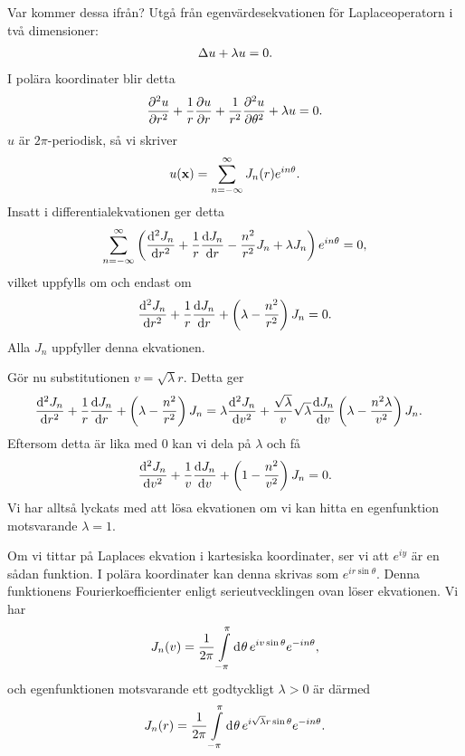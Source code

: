 Var kommer dessa ifrån? Utgå från egenvärdesekvationen för Laplaceoperatorn i två dimensioner:
\begin{align*}
	\Delta u + \lambda u = 0.
\end{align*}
I polära koordinater blir detta
\begin{align*}
	\pdv[2]{u}{r} + \frac{1}{r}\pdv{u}{r} + \frac{1}{r^{2}}\pdv[2]{u}{\theta} + \lambda u = 0.
\end{align*}
$u$ är $2\pi$-periodisk, så vi skriver
\begin{align*}
	u(\vb{x}) = \sum\limits_{n = -\infty}^{\infty}J_{n}(r)e^{in\theta}.
\end{align*}
Insatt i differentialekvationen ger detta
\begin{align*}
	\sum\limits_{n = -\infty}^{\infty}\left(\dv[2]{J_{n}}{r} + \frac{1}{r}\dv{J_{n}}{r} - \frac{n^{2}}{r^{2}}J_{n} + \lambda J_{n}\right)e^{in\theta} = 0,
\end{align*}
vilket uppfylls om och endast om
\begin{align*}
	\dv[2]{J_{n}}{r} + \frac{1}{r}\dv{J_{n}}{r} + \left(\lambda - \frac{n^{2}}{r^{2}}\right)J_{n} = 0.
\end{align*}
Alla $J_{n}$ uppfyller denna ekvationen.

Gör nu substitutionen $v = \sqrt{\lambda}r$. Detta ger
\begin{align*}
	\dv[2]{J_{n}}{r} + \frac{1}{r}\dv{J_{n}}{r} + \left(\lambda - \frac{n^{2}}{r^{2}}\right)J_{n} &= \lambda\dv[2]{J_{n}}{v} + \frac{\sqrt{\lambda}}{v}\sqrt{\lambda}\dv{J_{n}}{v} \left(\lambda - \frac{n^{2}\lambda}{v^{2}}\right)J_{n}.
\end{align*}
Eftersom detta är lika med $0$ kan vi dela på $\lambda$ och få
\begin{align*}
	\dv[2]{J_{n}}{v} + \frac{1}{v}\dv{J_{n}}{v} + \left(1 - \frac{n^{2}}{v^{2}}\right)J_{n} = 0.
\end{align*}
Vi har alltså lyckats med att lösa ekvationen om vi kan hitta en egenfunktion motsvarande $\lambda = 1$.

Om vi tittar på Laplaces ekvation i kartesiska koordinater, ser vi att $e^{iy}$ är en sådan funktion. I polära koordinater kan denna skrivas som $e^{ir\sin{\theta}}$. Denna funktionens Fourierkoefficienter enligt serieutvecklingen ovan löser ekvationen. Vi har
\begin{align*}
	J_{n}(v) = \frac{1}{2\pi}\int\limits_{-\pi}^{\pi}\dd[]{\theta}e^{iv\sin{\theta}}e^{-in\theta},
\end{align*}
och egenfunktionen motsvarande ett godtyckligt $\lambda > 0$ är därmed
\begin{align*}
	J_{n}(r) = \frac{1}{2\pi}\int\limits_{-\pi}^{\pi}\dd[]{\theta}e^{i\sqrt{\lambda}r\sin{\theta}}e^{-in\theta}.
\end{align*}

